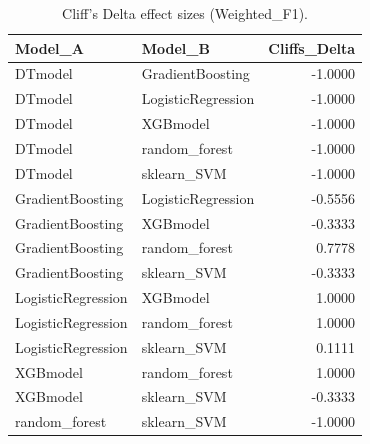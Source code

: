 \begin{table}[t]
\centering
\begin{tabular}{llr}
\toprule
Model_A & Model_B & Cliffs_Delta \\
\midrule
DTmodel & GradientBoosting & -1.0000 \\
DTmodel & LogisticRegression & -1.0000 \\
DTmodel & XGBmodel & -1.0000 \\
DTmodel & random_forest & -1.0000 \\
DTmodel & sklearn_SVM & -1.0000 \\
GradientBoosting & LogisticRegression & -0.5556 \\
GradientBoosting & XGBmodel & -0.3333 \\
GradientBoosting & random_forest & 0.7778 \\
GradientBoosting & sklearn_SVM & -0.3333 \\
LogisticRegression & XGBmodel & 1.0000 \\
LogisticRegression & random_forest & 1.0000 \\
LogisticRegression & sklearn_SVM & 0.1111 \\
XGBmodel & random_forest & 1.0000 \\
XGBmodel & sklearn_SVM & -0.3333 \\
random_forest & sklearn_SVM & -1.0000 \\
\bottomrule
\end{tabular}
\caption{Cliff's Delta effect sizes (Weighted_F1).}
\label{tab:cliffs_Weighted_F1}
\end{table}